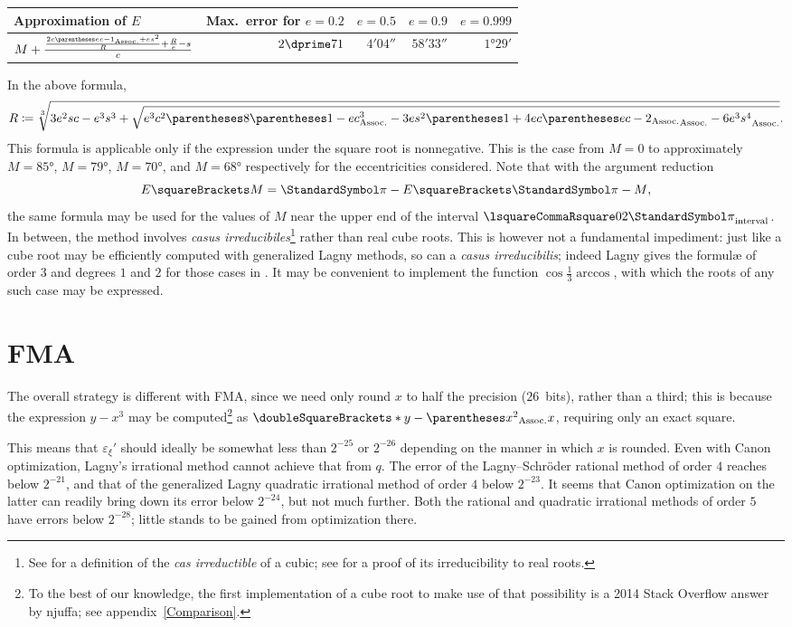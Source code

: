 ﻿\documentclass[10pt, a4paper, twoside]{basestyle}
\newcommand{\round}[1]{\doubleSquareBrackets*{#1}}
\begin{document}
\begin{center}
\begin{tabular}{lrrrr}
Approximation of $E$ & Max.~error for $e=0.2$ & $e=0.5$ & $e=0.9$ & $e=0.999$ \\
\hline
$M+\frac{\frac{2c\pa{ec-1}+es^2}{R}+\frac{R}{e}-s}{c}$
 & $2\dprime\llap.71$ & $4'04\dprime$ & $58'33\dprime$& $1°29'$
\end{tabular}
\end{center}
In the above formula,\[
R\DefineAs\sqrt[3]{3e^2sc-e^3s^3+\sqrt{e^3c^2\pa{8\pa{1-ec}^3-3es^2\pa{1+4ec\pa{ec-2}}-6e^3s^4}}}\text.
\]
This formula is applicable only if the expression under the square root is nonnegative.
This is the case from $M=0$ to approximately $M=85°$, $M=79°$, $M=70°$, and $M=68°$
respectively for the eccentricities considered. Note that with the argument reduction\[
E\of{M}=\Pi-E\of{\Pi-M}\text,\]
the same formula may be used for the values of $M$ near the upper end of the interval $\intclos{0}{2\Pi}$.
In between, the method involves 
\emph{casus irreducibiles}\footnote{See \cite[469]{FantetdeLagny1697} for a definition
of the \emph{cas irreductible} of a cubic; see \cite[125\psqq]{Wantzel1843} for a proof of its irreducibility to real
roots.} rather than real cube roots.
This is however not a fundamental impediment: just like a cube root may be efficiently computed with generalized Lagny
methods, so can a \emph{casus irreducibilis}; indeed Lagny gives the formulæ of order $3$ and degrees $1$ and $2$ for those
cases in \cite[41]{FantetdeLagny1692}. It may be convenient to implement the function
$\cos\frac{1}{3}\arccos$, with which the roots of any such case may be expressed.

\section{FMA}
\label{FMA}
The overall strategy is different with FMA, since we need only round $x$ to half the precision ($26$~bits),
rather than a third; this is because the expression $y-x^3$ may be computed\footnote{To the best of our knowledge,
the first implementation of a cube root to make use of that possibility is a 2014 Stack Overflow answer by njuffa; see
appendix~\ref{Comparison}.}
as $\round{y-\pa{x^2}x}$, requiring only an exact square.

This means that $ε_ξ'$ should ideally be somewhat less than $2^{-25}$ or $2^{-26}$ depending on
the manner in which $x$ is rounded. Even with Canon optimization, Lagny's irrational method cannot
achieve that from $q$. The error of the Lagny--Schröder rational method of order $4$ reaches below $2^{-21}$,
and that of the generalized Lagny quadratic irrational method of order $4$ below $2^{-23}$.
It seems that Canon optimization on the latter can readily bring down its error below $2^{-24}$, but not much
further.
Both the rational and quadratic irrational methods of order $5$ have errors below $2^{-28}$; little stands to be gained
from optimization there.
\end{document}
